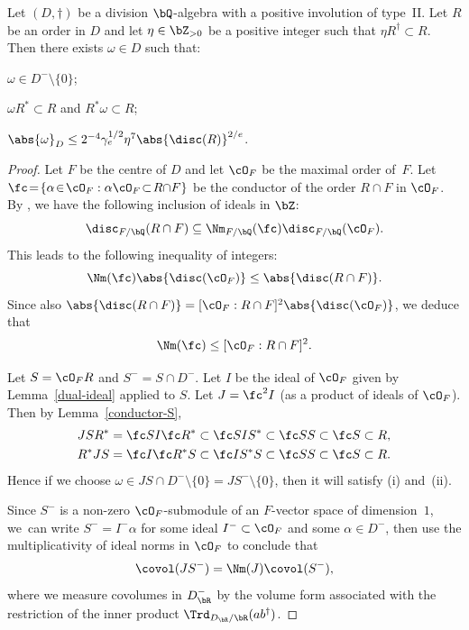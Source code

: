 \begin{lemma} \label{small-antisymm-star}
Let $(D, \dag)$ be a division $\bQ$-algebra with a positive involution of type~II.
Let $R$ be an order in $D$ and let $\eta \in \bZ_{>0}$ be a positive integer such that $\eta R^\dag \subset R$.
Then there exists $\omega \in D$ such that:
\begin{enumeratei}
\item $\omega \in D^- \setminus \{0\}$;
\item $\omega R^* \subset R$ and $R^* \omega \subset R$;
\item $\abs{\omega}_D \leq 2^{-4} \gamma_e^{1/2} \eta^7 \abs{\disc(R)}^{2/e}$.
\end{enumeratei}
\end{lemma}

\begin{proof}
Let $F$ be the centre of $D$ and let $\cO_F$ be the maximal order of~$F$.
Let $\fc\!=\!\{\alpha\!\in\!\cO_F:\alpha\cO_F\!\subset\! R{\cap} F\}$ be the conductor of the order $R \cap F$ in $\cO_F$.
By \hbox{\cite[(2)]{DCD00}}, we have the following inclusion of ideals in $\bZ$:
\[
\disc_{F/\bQ}(R \cap F) \subseteq \Nm_{F/\bQ}(\fc) \disc_{F/\bQ}(\cO_F).
\]
This leads to the following inequality of integers:
\[
\Nm(\fc) \abs{\disc(\cO_F)} \leq \abs{\disc(R \cap F)}.
\]
Since also $\abs{\disc(R \cap F)} = [\cO_F : R \cap F]^2 \abs{\disc(\cO_F)}$, we deduce that
\[
\Nm(\fc) \leq [\cO_F : R \cap F]^2.
\]

Let $S = \cO_F R$ and $S^- = S \cap D^-$.
Let $I$ be the ideal of $\cO_F$ given by Lemma~\ref{dual-ideal} applied to $S$.
Let $J = \fc^2 I$ (as a product of ideals of $\cO_F$).
Then by Lemma~\ref{conductor-S},
\begin{gather*}
JSR^* = \fc SI \fc R^* \subset \fc SIS^* \subset \fc SS \subset \fc S \subset R,
\\ R^*JS = \fc I \fc R^* S \subset \fc IS^*S \subset \fc SS \subset \fc S \subset R.
\end{gather*}
Hence if we choose $\omega \in JS \cap D^- \setminus \{0\} = JS^- \setminus \{ 0 \}$, then it will satisfy (i) and~(ii).

Since $S^-$ is a non-zero $\cO_F$-submodule of an $F$-vector space of dimension~$1$, we~can write $S^- = I^-\alpha$ for some ideal $I^- \subset \cO_F$ and some $\alpha \in D^-$, then use the multiplicativity of ideal norms in $\cO_F$ to conclude that
\[
\covol(JS^-) = \Nm(J) \covol(S^-),
\]
where we measure covolumes in $D_\bR^-$ by the volume form associated with the restriction of the inner product $\Trd_{D_\bR/\bR}(ab^\dag)$.


\end{proof}
